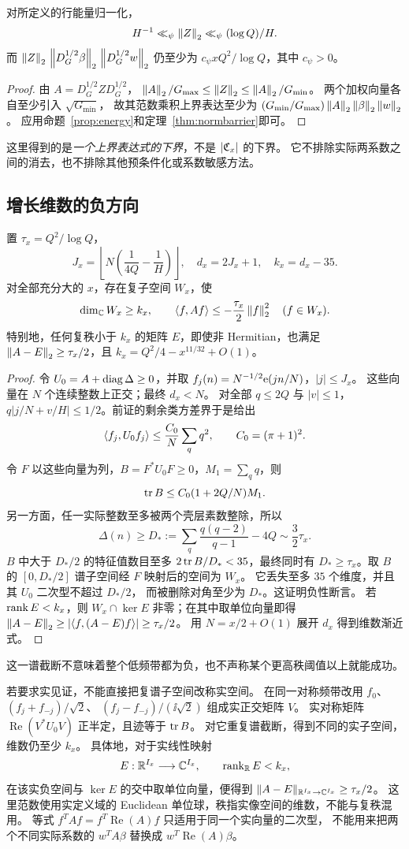 \begin{corollary}\label{cor:normalized}
对所定义的行能量归一化，
\[
H^{-1}\ll_\psi\left\|Z\right\|_2\ll_\psi(\log Q)/H.
\]
而 $\left\|Z\right\|_2\,\left\|D_G^{1/2}\beta\right\|_2\,\left\|D_G^{1/2}w\right\|_2$
仍至少为 $c_\psi xQ^2/\log Q$，其中 $c_\psi>0$。
\end{corollary}
\begin{proof}
由 $A=D_G^{1/2}ZD_G^{1/2}$，
$\left\|A\right\|_2/G_{\max}\le\left\|Z\right\|_2\le\left\|A\right\|_2/G_{\min}$。
两个加权向量各自至少引入 $\sqrt{G_{\min}}$，
故其范数乘积上界表达至少为
$(G_{\min}/G_{\max})\left\|A\right\|_2\left\|\beta\right\|_2\left\|w\right\|_2$。
应用命题~\ref{prop:energy}和定理~\ref{thm:normbarrier}即可。
\end{proof}
这里得到的是\emph{一个上界表达式的下界}，不是 $|\mathfrak C_x|$ 的下界。
它不排除实际两系数之间的消去，也不排除其他预条件化或系数敏感方法。

\subsection{增长维数的负方向}
\begin{theorem}[低秩修补的限定障碍]\label{thm:rank}
置 $\tau_x=Q^2/\log Q$，
\[
J_x=\left\lfloor N\left(\frac1{4Q}-\frac1H\right)\right\rfloor,\quad
d_x=2J_x+1,\quad k_x=d_x-35.
\]
对全部充分大的 $x$，存在复子空间 $W_x$，使
\[
\dim_\mathbb C W_x\ge k_x,\qquad
\langle f,Af\rangle\le-\frac{\tau_x}{2}\left\|f\right\|_2^2\quad(f\in W_x).
\]
特别地，任何复秩小于 $k_x$ 的矩阵 $E$，即使非 Hermitian，也满足
$\left\|A-E\right\|_2\ge\tau_x/2$，且
$k_x=Q^2/4-x^{11/32}+O(1)$。
\end{theorem}
\begin{proof}
令 $U_0=A+\operatorname{diag}\Delta\ge0$，并取
$f_j(n)=N^{-1/2}\mathrm e(jn/N)$，$|j|\le J_x$。
这些向量在 $N$ 个连续整数上正交；最终 $d_x<N$。
对全部 $q\le2Q$ 与 $|v|\le1$，
$q|j/N+v/H|\le1/2$。前证的剩余类方差界于是给出
\[
\langle f_j,U_0f_j\rangle\le\frac{C_0}{N}\sum_q q^2,\qquad C_0=(\pi+1)^2.
\]
令 $F$ 以这些向量为列，$B=F^*U_0F\ge0$，$M_1=\sum_q q$，则
\[
\operatorname{tr} B\le C_0(1+2Q/N)M_1.
\]
另一方面，任一实际整数至多被两个壳层素数整除，所以
\[
\Delta(n)\ge D_*:=\sum_q\frac{q(q-2)}{q-1}-4Q
\sim\frac32\tau_x .
\]
$B$ 中大于 $D_*/2$ 的特征值数目至多 $2\operatorname{tr} B/D_*<35$，最终同时有
$D_*\ge\tau_x$。取 $B$ 的 $[0,D_*/2]$ 谱子空间经 $F$ 映射后的空间为 $W_x$。
它丢失至多 $35$ 个维度，并且其 $U_0$ 二次型不超过 $D_*/2$，
而被删除对角至少为 $D_*$。这证明负性断言。
若 $\operatorname{rank} E<k_x$，则 $W_x\cap\ker E$ 非零；在其中取单位向量即得
$\left\|A-E\right\|_2\ge|\langle f,(A-E)f\rangle|\ge\tau_x/2$。
用 $N=x/2+O(1)$ 展开 $d_x$ 得到维数渐近式。
\end{proof}
这一谱截断不意味着整个低频带都为负，也不声称某个更高秩阈值以上就能成功。

若要求实见证，不能直接把复谱子空间改称实空间。
在同一对称频带改用 $f_0$、$(f_j+f_{-j})/\sqrt2$、
$(f_j-f_{-j})/(\ii\sqrt2)$ 组成实正交矩阵 $V$。
实对称矩阵 $\operatorname{Re}(V^*U_0V)$ 正半定，且迹等于 $\operatorname{tr} B$。
对它重复谱截断，得到不同的实子空间，维数仍至少 $k_x$。
具体地，对于实线性映射
\[
E:\mathbb R^{I_x}\longrightarrow\mathbb C^{I_x},\qquad \operatorname{rank}_{\mathbb R}E<k_x,
\]
在该实负空间与 $\ker E$ 的交中取单位向量，便得到
$\|A-E\|_{\mathbb R^{I_x}\to\mathbb C^{I_x}}\ge\tau_x/2$。
这里范数使用实定义域的 Euclidean 单位球，秩指实像空间的维数，不能与复秩混用。
等式 $f^TAf=f^T\operatorname{Re}(A)f$ 只适用于同一个实向量的二次型，
不能用来把两个不同实际系数的 $w^TA\beta$ 替换成 $w^T\operatorname{Re}(A)\beta$。
